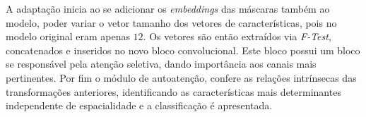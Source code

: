 A adaptação inicia ao se adicionar os \textit{embeddings} das máscaras também ao modelo, poder variar o vetor tamanho dos vetores de características, pois no modelo original eram apenas $12$. Os vetores são então extraídos via \textit{F-Test}, concatenados e inseridos no novo bloco convolucional. Este bloco possui um bloco \gls{se} responsável pela atenção seletiva, dando importância aos canais mais pertinentes. Por fim o módulo de autoatenção, confere as relações intrínsecas das transformações anteriores, identificando as características mais determinantes independente de espacialidade e a classificação é apresentada.